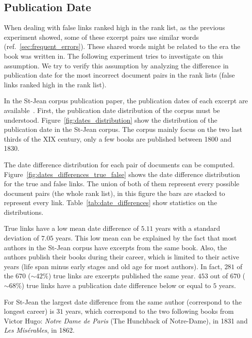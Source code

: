 \subsection{Publication Date}

When dealing with false links ranked high in the rank list, as the previous experiment showed, some of these excerpt pairs use similar words (ref.~\ref{sec:frequent_errors}).
These shared words might be related to the era the book was written in.
The following experiment tries to investigate on this assumption.
We try to verify this assumption by analyzing the difference in publication date for the most incorrect document pairs in the rank lists (false links ranked high in the rank list).

In the St-Jean corpus publication paper, the publication dates of each excerpt are available~\cite{st_jean}.
First, the publication date distribution of the corpus must be understood.
Figure~\ref{fig:dates_distribution} show the distribution of the publication date in the St-Jean corpus.
The corpus mainly focus on the two last thirds of the XIX century, only a few books are published between 1800 and 1830.

The date difference distribution for each pair of documents can be computed.
Figure~\ref{fig:dates_differences_true_false} shows the date difference distribution for the true and false links.
The union of both of them represent every possible document pairs (the whole rank list), in this figure the bars are stacked to represent every link.
Table~\ref{tab:date_differences} show statistics on the distributions.

True links have a low mean date difference of $5.11$ years with a standard deviation of $7.05$ years.
This low mean can be explained by the fact that most authors in the St-Jean corpus have excerpts from the same book.
Also, the authors publish their books during their career, which is limited to their active years (life span minus early stages and old age for most authors).
In fact, $281$ of the $670$ ($\sim 42\%$) true links are excerpts published the same year.
$453$ out of $670$ ($\sim 68\%$) true links have a publication date difference below or equal to $5$ years.

For St-Jean the largest date difference from the same author (correspond to the longest career) is $31$ years, which correspond to the two following books from Victor Hugo: \textit{Notre Dame de Paris} (The Hunchback of Notre-Dame), in 1831 and \textit{Les Misérables}, in 1862.

